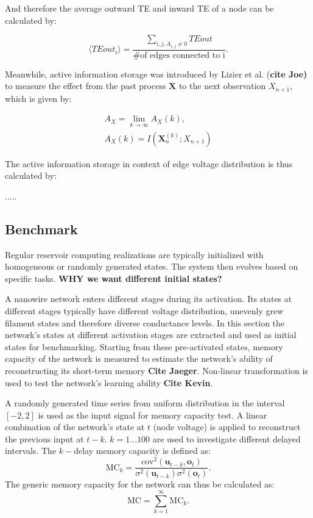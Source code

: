 \documentclass[fleqn,10pt,  amsmath,amssymb,aps]{wlscirep}
\begin{document}
And therefore the average outward TE and inward TE of a node can be calculated by:

\begin{equation}
\langle TEout_i \rangle = \frac{\sum \limits_{i,j, A_{i,j} \neq 0} TEout}{\text{\# of edges connected to i}}.
\end{equation}


Meanwhile, active information storage was introduced by Lizier et al. (\textbf{cite Joe)} to measure the effect from the past process $\mathbf X$ to the next observation $X_{n+1}$, which is given by:

\begin{align}
	A_X = \lim \limits_{k \rightarrow \infty} A_X (k),\\
	A_X(k) = I(\mathbf X_n^{(k)}; X_{n+1})
	\label{eq:AIS}
\end{align}

The active information storage in context of edge voltage distribution is thus calculated by:

.....

\subsection*{Benchmark}

Regular reservoir computing realizations are typically initialized with homogeneous or randomly generated states. The system then evolves based on specific tasks. \textbf{WHY we want different initial states?}


A nanowire network enters different stages during its activation. Its states at different stages typically have different voltage distribution, unevenly grew filament states and therefore diverse conductance levels. 
In this section the network's states at different activation stages are extracted and used as initial states for benchmarking. Starting from these pre-activated states, memory capacity of the network is measured to estimate the network's ability of reconstructing its short-term memory \textbf{Cite Jaeger}. Non-linear transformation is used to test the network's learning ability \textbf{Cite Kevin}.

A randomly generated time series from uniform distribution in the interval $[-2,2]$ is used as the input signal for memory capacity test. A linear combination of the network's state at $t$ (node voltage) is applied to reconstruct the previous input at $t - k$. $k = 1 ... 100$ are used to investigate different delayed intervals. The $k-$delay memory capacity is defined as:
\begin{equation}
	\text{MC}_k = \dfrac{\text{cov}^2(\mathbf u_{t-k}, \mathbf o_t)}{\sigma^2 (\mathbf u_{t-k}) \sigma^2 (\mathbf o_t)}.
\end{equation}
The generic memory capacity for the network can thus be calculated as:
\begin{equation}
	\text{MC} = \sum \limits_{k=1}^\infty \text{MC}_k.
\end{equation}
\end{document}
